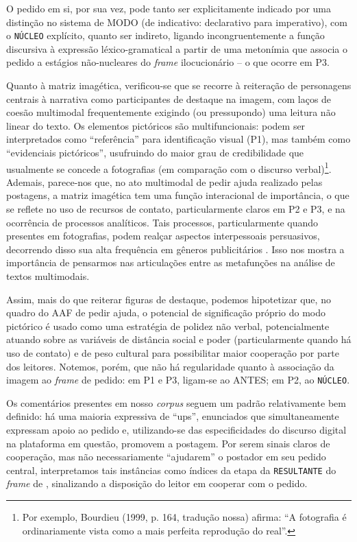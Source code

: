 \documentclass{textolivre}
\begin{document}
O pedido em si, por sua vez, pode tanto ser explicitamente indicado por uma distinção no sistema de MODO (de indicativo: declarativo para imperativo), com o \texttt{NÚCLEO} explícito, quanto ser indireto, ligando incongruentemente a função discursiva à expressão léxico-gramatical a partir de uma metonímia que associa o pedido a estágios não-nucleares do \textit{frame} ilocucionário – o que ocorre em P3.

Quanto à matriz imagética, verificou-se que se recorre à reiteração de personagens centrais à narrativa como participantes de destaque na imagem, com laços de coesão multimodal frequentemente exigindo (ou pressupondo) uma leitura não linear do texto. Os elementos pictóricos são multifuncionais: podem ser interpretados como “referência” para identificação visual (P1), mas também como “evidenciais pictóricos”, usufruindo do maior grau de credibilidade que usualmente se concede a fotografias (em comparação com o discurso verbal)\footnote{Por exemplo, Bourdieu (1999, p. 164, tradução nossa) afirma: “A fotografia é ordinariamente vista como a mais perfeita reprodução do real”.}. Ademais, parece-nos que, no ato multimodal de pedir ajuda realizado pelas postagens, a matriz imagética tem uma função interacional de importância, o que se reflete no uso de recursos de contato, particularmente claros em P2 e P3, e na ocorrência de processos analíticos. Tais processos, particularmente quando presentes em fotografias, podem realçar aspectos interpessoais persuasivos, decorrendo disso sua alta frequência em gêneros publicitários \cite[p. 89--90]{kress2006}. Isso nos mostra a importância de pensarmos nas articulações entre as metafunções na análise de textos multimodais.

Assim, mais do que reiterar figuras de destaque, podemos hipotetizar que, no quadro do AAF de pedir ajuda, o potencial de significação próprio do modo pictórico é usado como uma estratégia de polidez não verbal, potencialmente atuando sobre as variáveis de distância social e poder (particularmente quando há uso de contato) e de peso cultural para possibilitar maior cooperação por parte dos leitores. Notemos, porém, que não há regularidade quanto à associação da imagem ao \textit{frame} de pedido: em P1 e P3, ligam-se ao ANTES; em P2, ao \texttt{NÚCLEO}.

Os comentários presentes em nosso \textit{corpus} seguem um padrão relativamente bem definido: há uma maioria expressiva de “ups”, enunciados que simultaneamente expressam apoio ao pedido e, utilizando-se das especificidades do discurso digital na plataforma em questão, promovem a postagem. Por serem sinais claros de cooperação, mas não necessariamente “ajudarem” o postador em seu pedido central, interpretamos tais instâncias como índices da etapa da \texttt{RESULTANTE} do \textit{frame} de \textcite{panther2017}, sinalizando a disposição do leitor em cooperar com o pedido.
\end{document}
